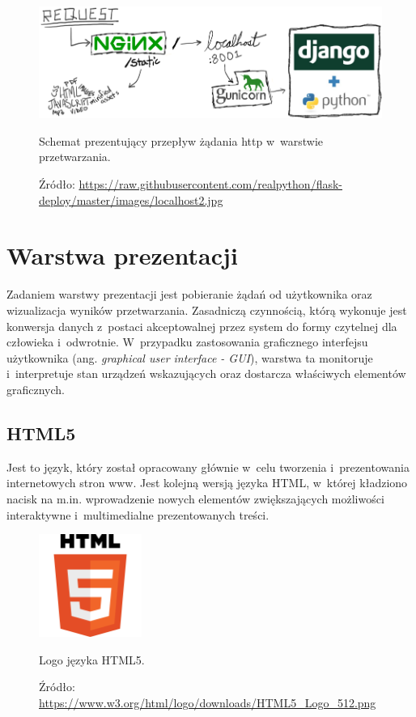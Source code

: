 \documentclass[a4paper,12pt,oneside]{mwrep}  %
\begin{document}
\begin{figure}[h]
\centering
\includegraphics[width=1\textwidth]{grafika/nginx_gunicorn_flask/nginx-gunicorn-django.png}
\caption{Schemat prezentujący przepływ żądania http w~warstwie przetwarzania.}
\vspace{-0.8cm}
\caption*{\scriptsize Źródło: \url{https://raw.githubusercontent.com/realpython/flask-deploy/master/images/localhost2.jpg}}
\label{nginx-gunicorn-django}
\end{figure}

\section{Warstwa prezentacji}
Zadaniem warstwy prezentacji jest pobieranie żądań od użytkownika oraz wizualizacja wyników przetwarzania. Zasadniczą czynnością, którą wykonuje jest konwersja danych z~postaci akceptowalnej przez system do formy czytelnej dla człowieka i~odwrotnie. W~przypadku zastosowania graficznego interfejsu użytkownika (ang. \emph{graphical user interface - GUI}), warstwa ta monitoruje i~interpretuje stan urządzeń wskazujących oraz dostarcza właściwych elementów graficznych.

\subsection{HTML5}
Jest to język, który został opracowany głównie w~celu tworzenia i~prezentowania internetowych stron www. Jest kolejną wersją języka HTML, w~której kładziono nacisk na m.in. wprowadzenie nowych elementów zwiększających możliwości interaktywne i~multimedialne prezentowanych treści.
\begin{figure}[h]
\centering
\includegraphics[width=0.3\textwidth]{grafika/loga/HTML5.png}
\caption{Logo języka HTML5.}
\vspace{-0.8cm}
\caption*{\scriptsize Źródło: \url{https://www.w3.org/html/logo/downloads/HTML5_Logo_512.png}}
\label{html5}
\end{figure}
\end{document}
